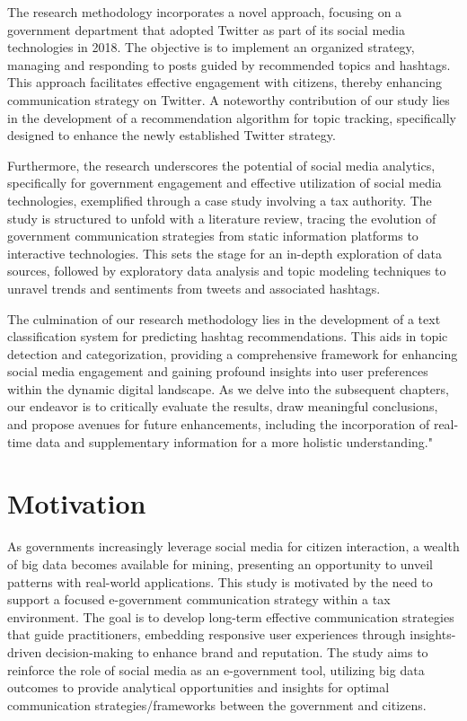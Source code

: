The research methodology incorporates a novel approach, focusing on a government department that adopted Twitter as part of its social media technologies in 2018. The objective is to implement an organized strategy, managing and responding to posts guided by recommended topics and hashtags. This approach facilitates effective engagement with citizens, thereby enhancing communication strategy on Twitter. A noteworthy contribution of our study lies in the development of a recommendation algorithm for topic tracking, specifically designed to enhance the newly established Twitter strategy.

Furthermore, the research underscores the potential of social media analytics, specifically for government engagement and effective utilization of social media technologies, exemplified through a case study involving a tax authority. The study is structured to unfold with a literature review, tracing the evolution of government communication strategies from static information platforms to interactive technologies. This sets the stage for an in-depth exploration of data sources, followed by exploratory data analysis and topic modeling techniques to unravel trends and sentiments from tweets and associated hashtags.

The culmination of our research methodology lies in the development of a text classification system for predicting hashtag recommendations. This aids in topic detection and categorization, providing a comprehensive framework for enhancing social media engagement and gaining profound insights into user preferences within the dynamic digital landscape. As we delve into the subsequent chapters, our endeavor is to critically evaluate the results, draw meaningful conclusions, and propose avenues for future enhancements, including the incorporation of real-time data and supplementary information for a more holistic understanding."

\section{Motivation}

As governments increasingly leverage social media for citizen interaction, a wealth of big data becomes available for mining, presenting an opportunity to unveil patterns with real-world applications. This study is motivated by the need to support a focused e-government communication strategy within a tax environment. The goal is to develop long-term effective communication strategies that guide practitioners, embedding responsive user experiences through insights-driven decision-making to enhance brand and reputation. The study aims to reinforce the role of social media as an e-government tool, utilizing big data outcomes to provide analytical opportunities and insights for optimal communication strategies/frameworks between the government and citizens.

